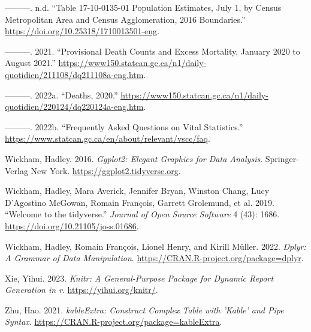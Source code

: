 \documentclass[
  letterpaper,
  DIV=11,
  numbers=noendperiod]{scrartcl}
\newlength{\cslhangindent}
\newlength{\cslentryspacingunit} %
\newenvironment{CSLReferences}[2] %
 {%
  \setlength{\parindent}{0pt}
  \ifodd #1
  \let\oldpar\par
  \def\par{\hangindent=\cslhangindent\oldpar}
  \fi
  \setlength{\parskip}{#2\cslentryspacingunit}
 }%
 {}
\begin{document}
\begin{CSLReferences}{1}{0}
\leavevmode{}%
---------. n.d. {``Table 17-10-0135-01 Population Estimates, July 1, by
Census Metropolitan Area and Census Agglomeration, 2016 Boundaries.''}
\url{https://doi.org/10.25318/1710013501-eng}.

\leavevmode{}%
---------. 2021. {``Provisional Death Counts and Excess Mortality,
January 2020 to August 2021.''}
\url{https://www150.statcan.gc.ca/n1/daily-quotidien/211108/dq211108a-eng.htm}.

\leavevmode{}%
---------. 2022a. {``Deaths, 2020.''}
\url{https://www150.statcan.gc.ca/n1/daily-quotidien/220124/dq220124a-eng.htm}.

\leavevmode{}%
---------. 2022b. {``Frequently Asked Questions on Vital Statistics.''}
\url{https://www.statcan.gc.ca/en/about/relevant/vscc/faq}.

\leavevmode{}%
Wickham, Hadley. 2016. \emph{Ggplot2: Elegant Graphics for Data
Analysis}. Springer-Verlag New York.
\url{https://ggplot2.tidyverse.org}.

\leavevmode{}%
Wickham, Hadley, Mara Averick, Jennifer Bryan, Winston Chang, Lucy
D'Agostino McGowan, Romain François, Garrett Grolemund, et al. 2019.
{``Welcome to the {tidyverse}.''} \emph{Journal of Open Source Software}
4 (43): 1686. \url{https://doi.org/10.21105/joss.01686}.

\leavevmode{}%
Wickham, Hadley, Romain François, Lionel Henry, and Kirill Müller. 2022.
\emph{Dplyr: A Grammar of Data Manipulation}.
\url{https://CRAN.R-project.org/package=dplyr}.

\leavevmode{}%
Xie, Yihui. 2023. \emph{Knitr: A General-Purpose Package for Dynamic
Report Generation in r}. \url{https://yihui.org/knitr/}.

\leavevmode{}%
Zhu, Hao. 2021. \emph{kableExtra: Construct Complex Table with 'Kable'
and Pipe Syntax}. \url{https://CRAN.R-project.org/package=kableExtra}.

\end{CSLReferences}
\end{document}
